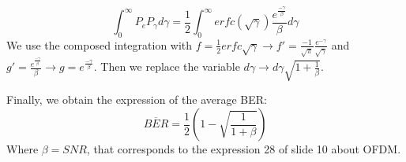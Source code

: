 
\begin{solution}
	$$\int_0^\infty P_e P_\gamma d\gamma = \frac{1}{2} \int_0^\infty erfc(\sqrt{\gamma}) \frac{e^{\frac{-\gamma}{\beta}}}{\beta} d\gamma$$
	We use the composed integration with $f = \frac{1}{2}erfc{\sqrt{\gamma}} \rightarrow f' = \frac{-1}{\sqrt{\pi}}\frac{e^{-\gamma}}{\sqrt{\gamma}}$ and $g' = \frac{e^{\frac{-\gamma}{\beta}}}{\beta} \rightarrow g = e^{\frac{-\gamma}{\beta}}$.
	Then we replace the variable $d\gamma \rightarrow d\gamma \sqrt{1 + \frac{1}{\beta}}$. 
	
	Finally, we obtain the expression of the average BER:
	$$\overline{BER} = \frac{1}{2}(1 - \sqrt{\frac{1}{1 + \beta}})$$
	Where $\beta = SNR$, that corresponds to the expression 28 of slide 10 about OFDM.
\end{solution}

\nosolution
